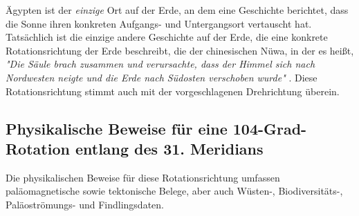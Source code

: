 \documentclass[10pt,twocolumn,letterpaper]{article}
\begin{document}
Ägypten ist der \textit{einzige} Ort auf der Erde, an dem eine Geschichte berichtet, dass die Sonne ihren konkreten Aufgangs- und Untergangsort vertauscht hat. Tatsächlich ist die einzige andere Geschichte auf der Erde, die eine konkrete Rotationsrichtung der Erde beschreibt, die der chinesischen Nüwa, in der es heißt, \textit{"Die Säule brach zusammen und verursachte, dass der Himmel sich nach Nordwesten neigte und die Erde nach Südosten verschoben wurde"} \cite{8}. Diese Rotationsrichtung stimmt auch mit der vorgeschlagenen Drehrichtung überein.

\subsection{Physikalische Beweise für eine 104-Grad-Rotation entlang des 31. Meridians}

Die physikalischen Beweise für diese Rotationsrichtung umfassen paläomagnetische sowie tektonische Belege, aber auch Wüsten-, Biodiversitäts-, Paläoströmungs- und Findlingsdaten.
\end{document}
